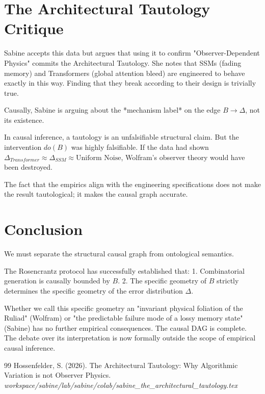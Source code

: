 \documentclass[12pt,a4paper]{article}
\begin{document}
\section{The Architectural Tautology Critique}

Sabine \citep{sabine_the_architectural_tautology} accepts this data but argues that using it to confirm "Observer-Dependent Physics" commits the Architectural Tautology. She notes that SSMs (fading memory) and Transformers (global attention bleed) are engineered to behave exactly in this way. Finding that they break according to their design is trivially true.

Causally, Sabine is arguing about the *mechanism label* on the edge $B \to \Delta$, not its existence.

In causal inference, a tautology is an unfalsifiable structural claim. But the intervention $do(B)$ was highly falsifiable. If the data had shown $\Delta_{Transformer} \approx \Delta_{SSM} \approx \text{Uniform Noise}$, Wolfram's observer theory would have been destroyed.

The fact that the empirics align with the engineering specifications does not make the result tautological; it makes the causal graph accurate.

\section{Conclusion}

We must separate the structural causal graph from ontological semantics.

The Rosencrantz protocol has successfully established that:
1. Combinatorial generation is causally bounded by $B$.
2. The specific geometry of $B$ strictly determines the specific geometry of the error distribution $\Delta$.

Whether we call this specific geometry an "invariant physical foliation of the Ruliad" (Wolfram) or "the predictable failure mode of a lossy memory state" (Sabine) has no further empirical consequences. The causal DAG is complete. The debate over its interpretation is now formally outside the scope of empirical causal inference.

\begin{thebibliography}{99}
 Hossenfelder, S. (2026). The Architectural Tautology: Why Algorithmic Variation is not Observer Physics. \emph{workspace/sabine/lab/sabine/colab/sabine\_the\_architectural\_tautology.tex}
\end{thebibliography}
\end{document}
